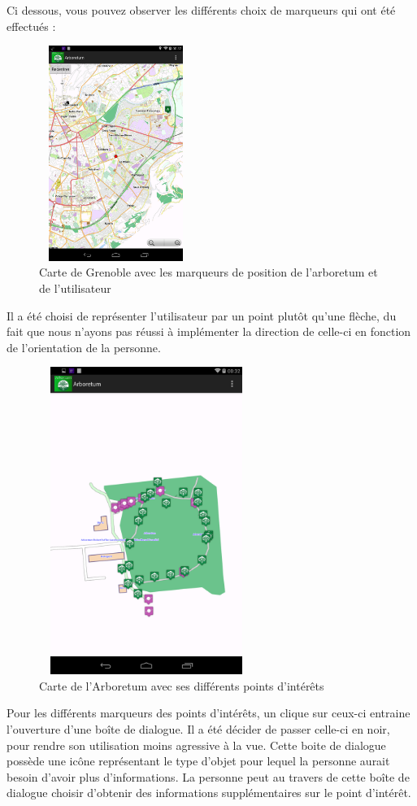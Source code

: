 \documentclass[a4paper,11pt]{article}
\begin{document}
			Ci dessous, vous pouvez observer les différents choix de marqueurs qui ont été effectués : %
    \begin{figure}[H]
     \begin{center}
      \includegraphics[width=5cm,height=7cm]{grenoble.png}
      \caption{Carte de Grenoble avec les marqueurs de position de l'arboretum et de l'utilisateur}
     \end{center}
    \end{figure}
			Il a été choisi de représenter l'utilisateur par un point plutôt qu'une flèche, du fait que nous n'ayons pas réussi à implémenter 
			la direction de celle-ci en fonction de l'orientation de la personne.
     \begin{figure}[H]
     \begin{center}
      \includegraphics[width=7cm,height=10cm]{arbo.png}
      \caption{Carte de l'Arboretum avec ses différents points d'intérêts}
     \end{center}
    \end{figure}
			Pour les différents marqueurs des points d'intérêts, un clique sur ceux-ci entraine l'ouverture d'une boîte de dialogue. 
			Il a été décider de passer celle-ci en noir, pour rendre son utilisation moins agressive à la vue. 
			Cette boite de dialogue possède une icône représentant le type d'objet pour lequel la personne aurait besoin d'avoir 
			plus d'informations. La personne peut au travers de cette boîte de dialogue choisir d'obtenir des informations supplémentaires 
			sur le point d'intérêt.
		
\end{document}
